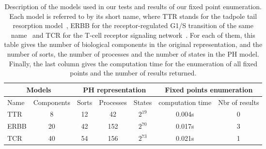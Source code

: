 \begin{table*}[ht]
\begin{center}
\noindent%
\begin{tabular}{|l|c||c|c|c||c|c|}
\hline
  \multicolumn{2}{|c||}{Models} & \multicolumn{3}{c||}{PH representation} & \multicolumn{2}{c|}{Fixed points enumeration} \\
\hline
  Name & Components & Sorts & Processes & States & computation time & Nbr of results \\
\hline
\hline
  TTR  & 8  & 12 & 42  & $2^{19}$ & 0.004s & 0 \\
\hline
  ERBB & 20 & 42 & 152 & $2^{70}$ & 0.017s & 3 \\
\hline
  TCR  & 40 & 54 & 156 & $2^{73}$ & 0.021s & 1 \\
\hline
\end{tabular}
\vspace*{4pt}
\caption{\label{tab:models}%
Description of the models used in our tests and results of our fixed point enumeration.
Each model is referred to by its short name, where
TTR stands for the tadpole tail resorption model~\cite{khalis2009smbionet},
ERBB for the receptor-regulated G1/S transition of the same name~\cite{Samaga2009}
and TCR for the T-cell receptor signaling network~\cite{Klamt06}.
For each of them, this table gives the number of biological components
in the original representation,
and the number of sorts, the number of processes
and the number of states in the PH model.
Finally, the last column gives the computation time for the enumeration of all fixed points
and the number of results returned.
}
\end{center}
\end{table*}

